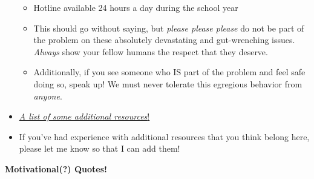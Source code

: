 \documentclass[11pt, a4paper]{article}
\begin{document}
\begin{itemize}
\begin{itemize}
        \item Hotline available 24 hours a day during the school year
        \item This should go without saying, but \textit{please please please} do not be part of the problem on these absolutely devastating and gut-wrenching issues. \textit{Always} show your fellow humans the respect that they deserve.
        \item Additionally, if you see someone who IS part of the problem and feel safe doing so, speak up! We must never tolerate this egregious behavior from \textit{anyone}. 
    \end{itemize}

    
    \item \href{https://medical.mit.edu/my-mit/parents/mental-health-resources}{\textit{A list of some additional resources}!}
    
    \item If you've had experience with additional resources that you think belong here, please let me know so that I can add them!
\end{itemize}


\newpage


\noindent\textbf{Motivational(?) Quotes!}
\end{document}
